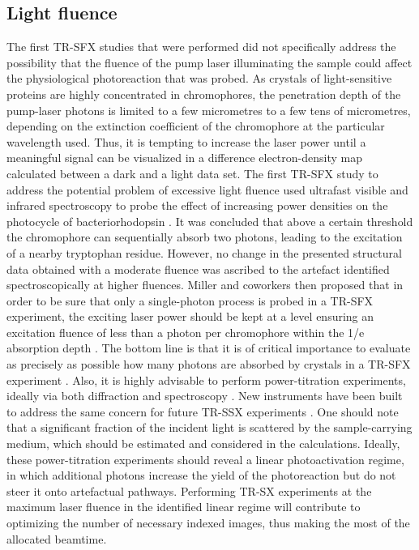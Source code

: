 \subsection{Light fluence}\label{sec:twophoton}

The first TR-SFX studies that were performed did not specifically address the possibility that the fluence of the pump laser illuminating the sample could affect the physiological photoreaction that was probed. As crystals of light-sensitive proteins are highly concentrated in chromophores, the penetration depth of the pump-laser photons is limited to a few micrometres to a few tens of micrometres, depending on the extinction coefficient of the chromophore at the particular wavelength used. Thus, it is tempting to increase the laser power until a meaningful signal can be visualized in a difference electron-density map calculated between a dark and a light data set. The first TR-SFX study to address the potential problem of excessive light fluence used ultrafast visible and infrared spectroscopy to probe the effect of increasing power densities on the photocycle of bacteriorhodopsin \parencite{nasskovacsThreedimensionalViewUltrafast2019}. It was concluded that above a certain threshold the chromophore can sequentially absorb two photons, leading to the excitation of a nearby tryptophan residue. However, no change in the presented structural data obtained with a moderate fluence was ascribed to the artefact identified spectroscopically at higher fluences. Miller and coworkers then proposed that in order to be sure that only a single-photon process is probed in a TR-SFX experiment, the exciting laser power should be kept at a level ensuring an excitation fluence of less than a photon per chromophore within the 1/e absorption depth \parencite{millerThreedimensionalViewUltrafast2020, besawAddressingHighExcitation2023}. The bottom line is that it is of critical importance to evaluate as precisely as possible how many photons are absorbed by crystals in a TR-SFX experiment \parencite{grunbeinIlluminationGuidelinesUltrafast2020}. Also, it is highly advisable to perform power-titration experiments, ideally via both diffraction and spectroscopy \parencite{barendsSerialFemtosecondCrystallography2022}. New instruments have been built to address the same concern for future TR-SSX experiments \parencite{engilbergeTRicOSSetupESRF2024}. One should note that a significant fraction of the incident light is scattered by the sample-carrying medium, which should be estimated and considered in the calculations. Ideally, these power-titration experiments should reveal a linear photoactivation regime, in which additional photons increase the yield of the photoreaction but do not steer it onto artefactual pathways. Performing TR-SX experiments at the maximum laser fluence in the identified linear regime will contribute to optimizing the number of necessary indexed images, thus making the most of the allocated beamtime.

